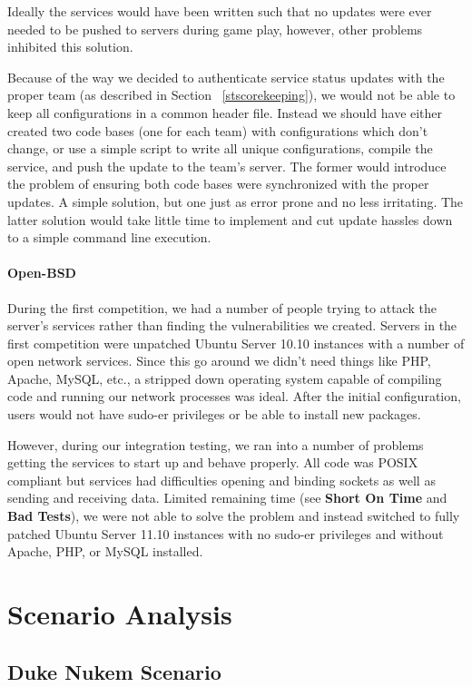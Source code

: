 \documentclass[10pt]{article}
\begin{document}
Ideally the services would have been written such that no updates were ever
needed to be pushed to servers during game play, however, other problems
inhibited this solution. 

Because of the way we decided to authenticate service status updates with
the proper team (as described in Section ~\ref{stscorekeeping}), we would
not be able to keep all configurations in a common header file. Instead we
should have either created two code bases (one for each team) with
configurations which don't change, or use a simple script to write all unique
configurations, compile the service, and push the update to the team's server.
The former would introduce the problem of ensuring both code bases were
synchronized with the proper updates. A simple solution, but one just as error
prone and no less irritating. The latter solution would take little time to
implement and cut update hassles down to a simple command line execution.

\paragraph*{Open-BSD} During the first competition, we had a
number of people trying to attack the server's services rather than finding the
vulnerabilities we created. Servers in the first competition were unpatched
Ubuntu Server 10.10 instances with a number of open network services. Since
this go around we didn't need things like PHP, Apache, MySQL, etc., a stripped
down operating system capable of compiling code and running our network
processes was ideal. After the initial configuration, users would not have
sudo-er privileges or be able to install new packages. 

However, during our integration testing, we ran into a number of problems
getting the services to start up and behave properly. All code was POSIX
compliant but services had difficulties opening and binding sockets as well as
sending and receiving data. Limited remaining time (see \textbf{Short On Time}
and \textbf{Bad Tests}), we were not able to solve the problem and instead
switched to fully patched Ubuntu Server 11.10 instances with no sudo-er
privileges and without Apache, PHP, or MySQL installed. 

\section{Scenario Analysis}

\subsection{Duke Nukem Scenario}
\end{document}
